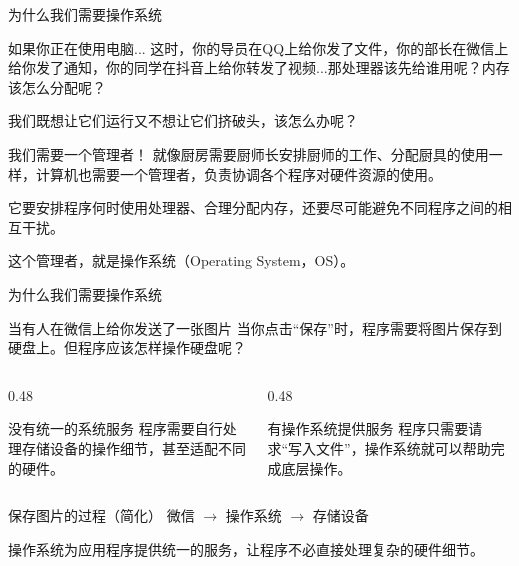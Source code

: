 \documentclass[aspectratio=169]{beamer}
\begin{document}
\begin{frame}{为什么我们需要操作系统}
\begin{block}{如果你正在使用电脑...}
\hspace*{2em}这时，你的导员在QQ上给你发了文件，你的部长在微信上给你发了通知，你的同学在抖音上给你转发了视频...那处理器该先给谁用呢？内存该怎么分配呢？

\par\hspace*{2em}我们既想让它们运行又不想让它们挤破头，该怎么办呢？
\end{block}

\begin{block}{我们需要一个管理者！}
\hspace*{2em}就像厨房需要厨师长安排厨师的工作、分配厨具的使用一样，计算机也需要一个管理者，负责协调各个程序对硬件资源的使用。

\par\hspace*{2em}它要安排程序何时使用处理器、合理分配内存，还要尽可能避免不同程序之间的相互干扰。

\par\hspace*{2em}\alert{这个管理者，就是操作系统（Operating System，OS）。}
\end{block}
\end{frame}

\begin{frame}{为什么我们需要操作系统}
	
	\begin{block}{当有人在微信上给你发送了一张图片}
		\hspace*{2em}当你点击“保存”时，程序需要将图片保存到硬盘上。但程序应该怎样操作硬盘呢？
	\end{block}
	
	\begin{columns}[T,onlytextwidth]
		\begin{column}{0.48\textwidth}
			\begin{block}{没有统一的系统服务}
				程序需要自行处理存储设备的操作细节，甚至适配不同的硬件。
			\end{block}
		\end{column}
		
		\begin{column}{0.48\textwidth}
			\begin{block}{有操作系统提供服务}
				程序只需要请求“写入文件”，操作系统就可以帮助完成底层操作。
			\end{block}
		\end{column}
	\end{columns}
	
	\begin{block}{保存图片的过程（简化）}
		\centering
		微信
		$\longrightarrow$
		操作系统
		$\longrightarrow$
		存储设备
	\end{block}
	
	\vspace{0.3cm}
	
	\begin{center}
		\alert{操作系统为应用程序提供统一的服务，让程序不必直接处理复杂的硬件细节。}
	\end{center}
	
\end{frame}
\end{document}
